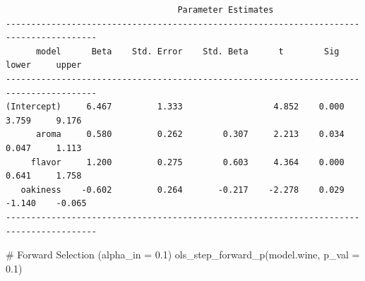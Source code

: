 \documentclass[
  letterpaper,
  DIV=11,
  numbers=noendperiod]{scrreprt}
\newenvironment{Shaded}{\begin{snugshade}}{\end{snugshade}}
\newcommand{\AttributeTok}[1]{\textcolor[rgb]{0.40,0.45,0.13}{#1}}
\newcommand{\CommentTok}[1]{\textcolor[rgb]{0.37,0.37,0.37}{#1}}
\newcommand{\FloatTok}[1]{\textcolor[rgb]{0.68,0.00,0.00}{#1}}
\newcommand{\FunctionTok}[1]{\textcolor[rgb]{0.28,0.35,0.67}{#1}}
\newcommand{\NormalTok}[1]{\textcolor[rgb]{0.00,0.23,0.31}{#1}}
\begin{document}
\begin{verbatim}
                                  Parameter Estimates                                    
----------------------------------------------------------------------------------------
      model      Beta    Std. Error    Std. Beta      t        Sig      lower     upper 
----------------------------------------------------------------------------------------
(Intercept)     6.467         1.333                  4.852    0.000     3.759     9.176 
      aroma     0.580         0.262        0.307     2.213    0.034     0.047     1.113 
     flavor     1.200         0.275        0.603     4.364    0.000     0.641     1.758 
   oakiness    -0.602         0.264       -0.217    -2.278    0.029    -1.140    -0.065 
----------------------------------------------------------------------------------------
\end{verbatim}

\begin{Shaded}
\begin{Highlighting}[]
\CommentTok{\# Forward Selection (alpha\_in = 0.1)}
\FunctionTok{ols\_step\_forward\_p}\NormalTok{(model.wine, }\AttributeTok{p\_val =} \FloatTok{0.1}\NormalTok{)}
\end{Highlighting}
\end{Shaded}
\end{document}
